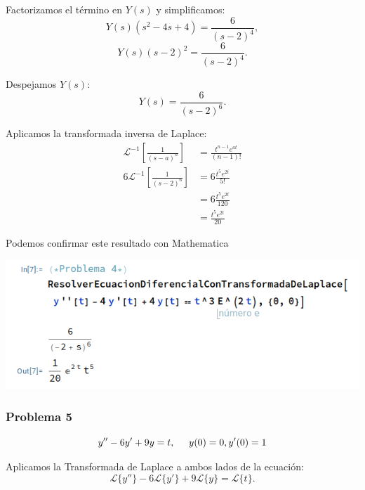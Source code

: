 \documentclass{article}
\begin{document}
Factorizamos el término en \(Y(s)\) y simplificamos:
\begin{equation*}
    Y(s)(s^2 - 4s + 4) = \frac{6}{(s-2)^4},
\end{equation*}
\begin{equation*}
    Y(s)(s - 2)^2 = \frac{6}{(s-2)^4}.
\end{equation*}

Despejamos \(Y(s)\):
\begin{equation*}
    Y(s) = \frac{6}{(s-2)^6}.
\end{equation*}

Aplicamos la transformada inversa de Laplace:
\begin{align*}
    \mathcal{L}^{-1}\left[\frac{1}{(s-a)^n}\right]  & = \frac{t^{n-1}e^{at}}{(n-1)!} \\
    6\mathcal{L}^{-1}\left[\frac{1}{(s-2)^6}\right] & = 6\frac{t^{5}e^{2t}}{5!}      \\
                                                    & = 6\frac{t^{5}e^{2t}}{120}     \\
                                                    & = \frac{t^{5}e^{2t}}{20}
\end{align*}

Podemos confirmar este resultado con Mathematica

\begin{center}
    \includegraphics[width=1\textwidth]{../ED 2/image4.png}
\end{center}


\newpage


\subsubsection{Problema 5}

\[y'' - 6y' + 9y = t, \hspace{.5cm} y(0) = 0, y'(0) = 1\]

Aplicamos la Transformada de Laplace a ambos lados de la ecuación:
\[
    \mathcal{L}\{y''\} - 6\mathcal{L}\{y'\} + 9\mathcal{L}\{y\} = \mathcal{L}\{t\}.
\]
\end{document}

